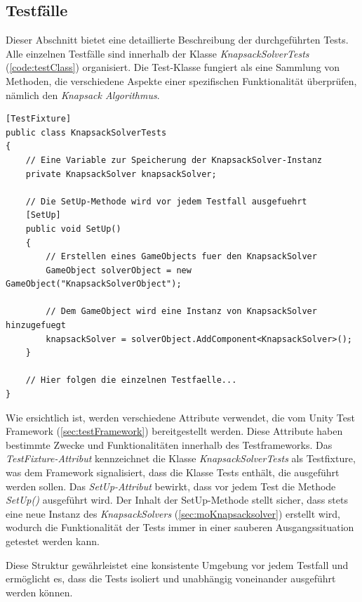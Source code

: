 \begin{itemize}
\subsection{\label{sec:tests}Testfälle}

Dieser Abschnitt bietet eine detaillierte Beschreibung der durchgeführten Tests. Alle einzelnen Testfälle sind innerhalb der Klasse \textit{KnapsackSolverTests} (\ref{code:testClass}) organisiert. Die Test-Klasse fungiert als eine Sammlung von Methoden, die verschiedene Aspekte einer spezifischen Funktionalität überprüfen, nämlich den \textit{Knapsack Algorithmus}.

\begin{lstlisting}[style=csharp, caption={Auszug aus der Test-Klasse}, label={code:testClass}]
[TestFixture]
public class KnapsackSolverTests
{
    // Eine Variable zur Speicherung der KnapsackSolver-Instanz
    private KnapsackSolver knapsackSolver;

    // Die SetUp-Methode wird vor jedem Testfall ausgefuehrt
    [SetUp]
    public void SetUp()
    {
        // Erstellen eines GameObjects fuer den KnapsackSolver
        GameObject solverObject = new GameObject("KnapsackSolverObject");

        // Dem GameObject wird eine Instanz von KnapsackSolver hinzugefuegt
        knapsackSolver = solverObject.AddComponent<KnapsackSolver>();
    }

    // Hier folgen die einzelnen Testfaelle...
}
\end{lstlisting}

Wie ersichtlich ist, werden verschiedene Attribute verwendet, die vom Unity Test Framework (\ref{sec:testFramework}) bereitgestellt werden. Diese Attribute haben bestimmte Zwecke und Funktionalitäten innerhalb des Testframeworks. Das \textit{TestFixture-Attribut} kennzeichnet die Klasse \textit{KnapsackSolverTests} als Testfixture, was dem Framework signalisiert, dass die Klasse Tests enthält, die ausgeführt werden sollen. Das \textit{SetUp-Attribut} bewirkt, dass vor jedem Test die Methode \textit{SetUp()} ausgeführt wird. Der Inhalt der SetUp-Methode stellt sicher, dass stets eine neue Instanz des \textit{KnapsackSolvers} (\ref{sec:moKnapsacksolver}) erstellt wird, wodurch die Funktionalität der Tests immer in einer sauberen Ausgangssituation getestet werden kann.

Diese Struktur gewährleistet eine konsistente Umgebung vor jedem Testfall und ermöglicht es, dass die Tests isoliert und unabhängig voneinander ausgeführt werden können.



\end{itemize}
